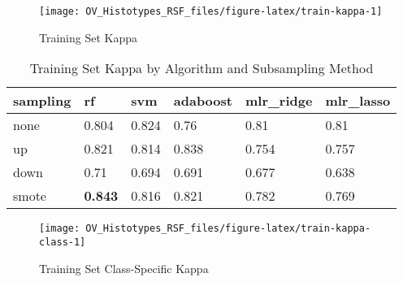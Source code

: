 \documentclass[
]{report}
\begin{document}
\begin{figure}[H]

{\centering \texttt{[image: OV\_Histotypes\_RSF\_files/figure-latex/train-kappa-1]} 

}

\caption{Training Set Kappa}\label{fig:train-kappa}
\end{figure}

\begin{table}

\caption{\label{tab:train-kappa-table}Training Set Kappa by Algorithm and Subsampling Method}
\centering
\begin{tabular}[t]{l|l|l|l|l|l}
\hline
sampling & rf & svm & adaboost & mlr\_ridge & mlr\_lasso\\
\hline
none & 0.804 & 0.824 & 0.76 & 0.81 & 0.81\\
\hline
up & 0.821 & 0.814 & 0.838 & 0.754 & 0.757\\
\hline
down & 0.71 & 0.694 & 0.691 & 0.677 & 0.638\\
\hline
smote & \textbf{0.843} & 0.816 & 0.821 & 0.782 & 0.769\\
\hline
\end{tabular}
\end{table}

\begin{figure}[H]

{\centering \texttt{[image: OV\_Histotypes\_RSF\_files/figure-latex/train-kappa-class-1]} 

}

\caption{Training Set Class-Specific Kappa}\label{fig:train-kappa-class}
\end{figure}
\end{document}

